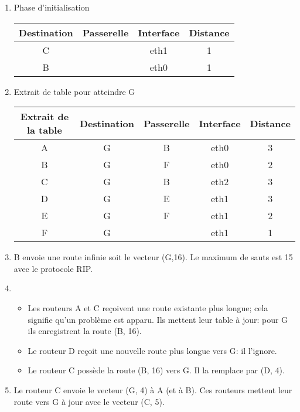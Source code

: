 \documentclass[a4paper,11pt]{article}
\begin{document}
\begin{exo}
    
    \begin{enumerate}
        \item Phase d'initialisation
        \begin{center}
            \begin{tabular}{|*{4}{c|}}
                \hline
                Destination & Passerelle & Interface & Distance \\
                \hline
                C & & eth1 & 1\\
                \hline
                B & & eth0 & 1\\
                \hline
            \end{tabular}
        \end{center}
        \item Extrait de table pour atteindre G
        \begin{center}
            \begin{tabular}{|*{5}{c|}}
                \hline
                Extrait de la table & Destination & Passerelle & Interface & Distance \\
                \hline
                A & G & B & eth0 & 3\\
                \hline
                B & G & F & eth0 & 2\\
                \hline
                C & G & B & eth2 & 3\\
                \hline
                D & G & E & eth1 & 3\\
                \hline
                E & G & F & eth1 & 2\\
                \hline
                F & G &  & eth1 & 1\\
                \hline
            \end{tabular}
        \end{center}
        \item B envoie une route infinie soit le vecteur (G,16). Le maximum de sauts est 15 avec le protocole RIP.
        \item 
              \begin{itemize}
                  \item Les routeurs A et C reçoivent une route existante plus longue; cela signifie qu'un problème est apparu. Ils mettent leur table à jour: pour G ils enregistrent la route (B, 16).
                  \item Le routeur D reçoit une nouvelle route plus longue vers G: il l'ignore.
                  \item Le routeur C possède la route (B, 16) vers G. Il la remplace par (D, 4).
              \end{itemize}
        \item Le routeur C envoie le vecteur (G, 4) à A (et à B). Ces routeurs mettent leur route vers G à jour avec le vecteur (C, 5).
    \end{enumerate}
\end{exo}
\end{document}
